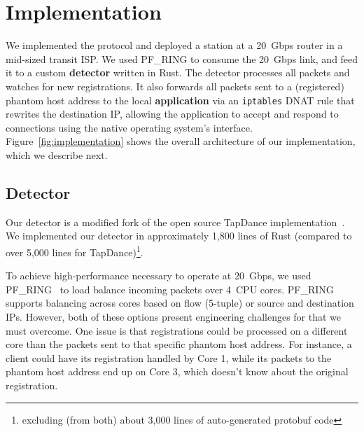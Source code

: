 \documentclass[sigconf,anonymous]{acmart}
\begin{document}
\TabApplications


\section{Implementation}
\label{sec:implementation}

We implemented the \scheme protocol and deployed a station at a
20~Gbps router in a mid-sized transit ISP. We used PF\_RING to
consume the 20~Gbps link, and feed it to a custom \textbf{detector} written in Rust. The
detector processes all packets and watches for new registrations. It also
forwards all packets sent to a (registered) phantom host address to the local
\textbf{application} via an \texttt{iptables} DNAT rule that rewrites the destination IP,
allowing the application to accept and respond to connections using the native
operating system's interface. Figure~\ref{fig:implementation} shows the overall
architecture of our implementation, which we describe next.

\FigImplementation

\subsection{Detector}

Our detector is a modified fork of the open source TapDance
implementation~\cite{tapdance-source}.
We implemented our detector in approximately 1,800 lines of Rust (compared to
over 5,000 lines for TapDance)\footnote{excluding (from both) about 3,000 lines
of auto-generated protobuf code}.

To achieve high-performance necessary to operate at 20~Gbps, we used
PF\_RING~\cite{pfring} to load balance incoming packets over 4~CPU cores. PF\_RING
supports balancing across cores based on flow (5-tuple) or source and
destination IPs. However, both of these options present engineering challenges
for \scheme that we must overcome.
One issue is that registrations could be processed on a
different core than the packets sent to that specific phantom host address. For
instance, a client could have its registration handled by Core 1, while its
packets to the phantom host address end up on Core 3, which doesn't know about the
original registration.
\end{document}
